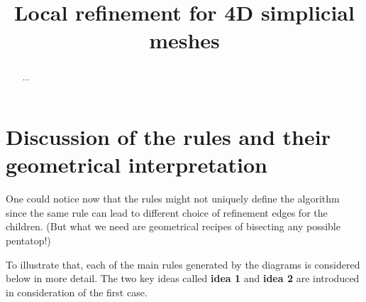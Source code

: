 \documentclass[a4paper,12pt]{amsart}
\title[Local refinement in 4D] 
{Local refinement for 4D simplicial meshes}
\numberwithin{equation}{section}
\begin{document}
 
\begin{abstract}
...
\end{abstract}
\maketitle

\section{Discussion of the rules and their geometrical interpretation}

One could notice now that the rules might not uniquely define the algorithm since the same rule can lead to different choice of refinement edges for the children. (But what we need are geometrical recipes of bisecting any possible pentatop!)

To illustrate that, each of the main rules generated by the diagrams is considered below in more detail. The two key ideas called \textbf{idea 1} and \textbf{idea 2} are introduced in consideration of the first case.
\end{document}
